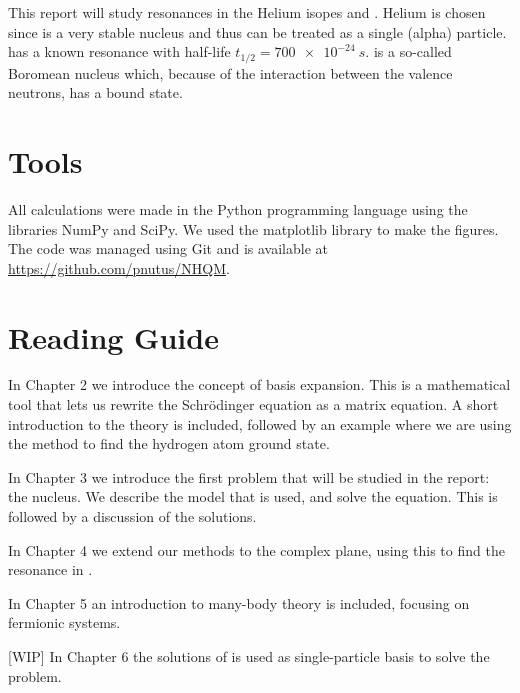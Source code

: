 This report will study resonances in the Helium isopes  and .
Helium is chosen since  is a very stable nucleus and thus can be treated as a single (alpha) particle.
 has a known resonance with half-life $t_{1/2} = \SI{700e-24}{s}$.
 is a so-called Boromean nucleus which, because of the interaction between the valence neutrons, has a bound state.




\section{Tools}

All calculations were made in the Python programming language using the libraries NumPy and SciPy. We used the matplotlib library to make the figures. The code was managed using Git and is available at \url{https://github.com/pnutus/NHQM}.


\section{Reading Guide}
In Chapter 2 we introduce the concept of basis expansion. This is a mathematical tool that lets us rewrite the Schrödinger equation as a matrix equation. A short introduction to the theory is included, followed by an example where we are using the method to find the hydrogen atom ground state.

In Chapter 3 we introduce the first problem that will be studied in the report: the  nucleus. We describe the model that is used, and solve the equation. This is followed by a discussion of the solutions.

In Chapter 4 we extend our methods to the complex plane, using this to find the resonance in .

In Chapter 5 an introduction to many-body theory is included, focusing on fermionic systems.  

[WIP] In Chapter 6 the solutions of  is used as single-particle basis to solve the  problem. 
